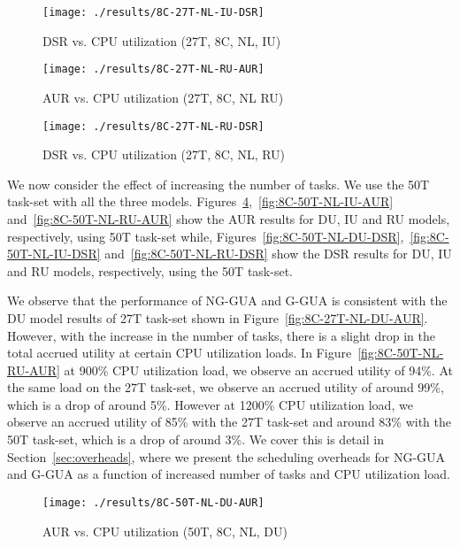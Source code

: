 \documentclass[12pt,dvips]{report}
\begin{document}
\begin{figure} [htbp]
  \centering
  \texttt{[image: ./results/8C-27T-NL-IU-DSR]}
  \caption{ DSR vs. CPU utilization (27T, 8C, NL, IU) }
  \label{fig:8C-27T-NL-IU-DSR}
\end{figure}
 
\begin{figure} [htbp]
  \centering
  \texttt{[image: ./results/8C-27T-NL-RU-AUR]}
  \caption{ AUR vs. CPU utilization (27T, 8C, NL RU) }
  \label{fig:8C-27T-NL-RU-AUR}
\end{figure}
 
\begin{figure} [htbp]
  \centering
  \texttt{[image: ./results/8C-27T-NL-RU-DSR]}
  \caption{DSR vs. CPU utilization (27T, 8C, NL, RU) }
  \label{fig:8C-27T-NL-RU-DSR}
\end{figure}
 
We now consider the effect of increasing the number of tasks. We use the 50T task-set with all the three models. Figures~\ref{fig:8C-50T-NL-DU-AUR},~\ref{fig:8C-50T-NL-IU-AUR} and~\ref{fig:8C-50T-NL-RU-AUR} show the AUR results for DU, IU and RU models, respectively, using 50T task-set while, Figures~\ref{fig:8C-50T-NL-DU-DSR},~\ref{fig:8C-50T-NL-IU-DSR} and~\ref{fig:8C-50T-NL-RU-DSR} show the DSR results for DU, IU and RU models, respectively, using the 50T task-set.

We observe that the performance of NG-GUA and G-GUA is consistent with the DU model results of 27T task-set shown in Figure~\ref{fig:8C-27T-NL-DU-AUR}. However, with the increase in the number of tasks, there is a slight drop in the total accrued utility at certain CPU utilization loads. In Figure~\ref{fig:8C-50T-NL-RU-AUR} at 900\% CPU utilization load, we observe an accrued utility of 94\%. At the same load on the 27T task-set, we observe an accrued utility of around 99\%, which is a drop of around 5\%. However at 1200\% CPU utilization load, we observe an accrued utility of 85\% with the 27T task-set and around 83\% with the 50T task-set, which is a drop of around 3\%. We cover this is detail in Section~\ref{sec:overheads}, where we present the scheduling overheads for NG-GUA and G-GUA as a function of increased number of tasks and CPU utilization load.
 
\begin{figure} [htbp]
  \centering
  \texttt{[image: ./results/8C-50T-NL-DU-AUR]}
  \caption{AUR vs. CPU utilization (50T, 8C, NL, DU) }
  \label{fig:8C-50T-NL-DU-AUR}
\end{figure}
 
\end{document}
